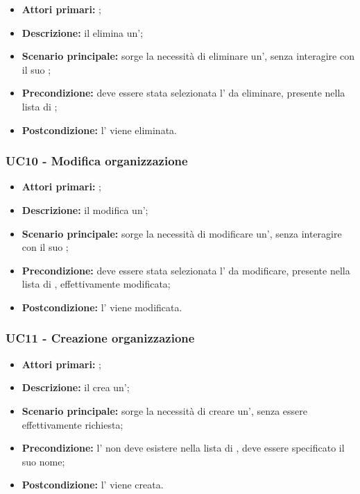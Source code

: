\documentclass[casi-duso]{subfiles}
\begin{document}
\begin{itemize}
  \item \textbf{Attori primari:} ;
  \item \textbf{Descrizione:} il  elimina un';
  \item \textbf{Scenario principale:} sorge la necessità di eliminare un', senza interagire con il suo ;
  \item \textbf{Precondizione:} deve essere stata selezionata l' da eliminare, presente nella lista di ;
  \item \textbf{Postcondizione:} l' viene eliminata.

\end{itemize}


\subsubsection{UC10 - Modifica organizzazione}
\label{subsub:UC10}

\begin{itemize}
  \item \textbf{Attori primari:} ;
  \item \textbf{Descrizione:} il  modifica un';
  \item \textbf{Scenario principale:} sorge la necessità di modificare un', senza interagire con il suo ;
  \item \textbf{Precondizione:} deve essere stata selezionata l' da modificare, presente nella lista di , effettivamente modificata;
  \item \textbf{Postcondizione:} l' viene modificata.

\end{itemize}


\subsubsection{UC11 - Creazione organizzazione}
\label{subsub:UC11}

\begin{itemize}
  \item \textbf{Attori primari:} ;
  \item \textbf{Descrizione:} il  crea un';
  \item \textbf{Scenario principale:} sorge la necessità di creare un', senza essere effettivamente richiesta;
  \item \textbf{Precondizione:} l' non deve esistere nella lista di , deve essere specificato il suo nome;
  \item \textbf{Postcondizione:} l' viene creata.

\end{itemize}
\end{document}
